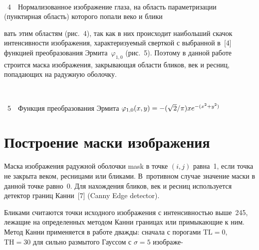 \begin{multicols}{2}
\begin{center} %
\vspace*{6pt}
\mbox{%
\epsfxsize=78mm
}
\end{center}
{{\figurename~4}\ \ \small{Нормализованное изображение глаза, на область параметризации (пунктирная область) 
которого попали веко и блики}}


\addtocounter{figure}{2}

\noindent
вать этим областям (рис.~4), так как в них 
происходит наибольший скачок интенсивности изобра\-же\-ния, характеризуемый 
сверткой с выбранной в~[4] функцией преобразования Эрмита~$\varphi_{1,0}$ 
(рис.~5).
Поэтому в данной работе строится маска изображения, закрывающая области 
бликов, век и ресниц, попадающих на радужную оболочку.

\begin{center} %
\vspace*{6pt}
\mbox{%
\epsfxsize=56mm
}
\end{center}
\vspace*{3pt}
{{\figurename~5}\ \ \small{Функция преобразования Эрмита $\varphi_{1,0}(x,y)\hm = -(\sqrt{2}/\pi) x e^{-(x^2+y^2)} $}}
\vspace*{9pt}


\addtocounter{figure}{1}

\section{Построение маски изображения}

Маска изображения радужной оболочки mask в точке $(i,j)$ равна~1, если точка 
не закрыта веком, ресницами или бликами. В~противном случае значение маски в 
данной точке равно~0. Для на\-хож\-де\-ния бликов, век и ресниц используется 
детектор границ Канни~[7] (Canny Edge detector).


Бликами считаются точки исходного изображения с интенсивностью выше~245, 
лежащие на определенных методом Канни границах или примыкающие к ним. 
Метод Канни применяется в работе дважды: сначала с порогами $\mathrm{TL} = 0$, $\mathrm{TH} = 
30$ для сильно размытого Гауссом с $\sigma = 5$ изображе-\linebreak


\end{multicols}
